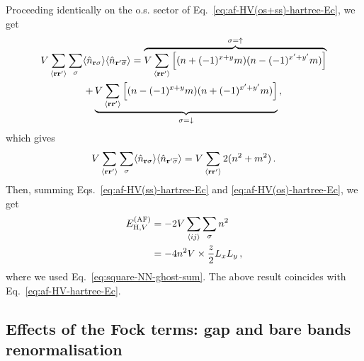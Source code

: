 \begin{tabproof}
	Proceeding identically on the o.s. sector of Eq.~\eqref{eq:af-HV(os+ss)-hartree-Ec}, we get
	\begin{multline*}
		V \sum_{\ev{\mathbf{r}\mathbf{r}'}} \sum_\sigma \langle
		\hat n_{\mathbf{r}\sigma}
		\rangle \langle
		\hat n_{\mathbf{r}'\overline{\sigma}}
		\rangle = \overbrace{
			V \sum_{\ev{\mathbf{r}\mathbf{r}'}} \left[
			(
			n + (-1)^{x+y} m
			) (
			n - (-1)^{x'+y'} m
			)
			\right]
		}^{\sigma=\uparrow} \\
		+ \underbrace{
			V \sum_{\ev{\mathbf{r}\mathbf{r}'}} \left[
			(
			n - (-1)^{x+y} m
			) (
			n + (-1)^{x'+y'} m
			)
			\right]
		}_{\sigma=\downarrow} \, ,
	\end{multline*}
	which gives
	\begin{equation}\label{eq:af-HV(os)-hartree-Ec}
		V \sum_{\ev{\mathbf{r}\mathbf{r}'}} \sum_\sigma \langle
		\hat n_{\mathbf{r}\sigma}
		\rangle \langle
		\hat n_{\mathbf{r}'\overline{\sigma}}
		\rangle = V \sum_{\ev{\mathbf{r}\mathbf{r}'}} 2(
		n^2+m^2
		) \, .
	\end{equation}
	Then, summing Eqs.~\eqref{eq:af-HV(ss)-hartree-Ec} and \eqref{eq:af-HV(os)-hartree-Ec}, we get
	\[
	\begin{aligned}
	E_{\mathrm{H},V}^{(\mathrm{AF})} &= - 2V \sum_{\ev{ij}} \sum_\sigma n^2 \\
	&= - 4n^2 V \times \frac{z}{2} L_x L_y \, ,
	\end{aligned}
	\]
	where we used Eq.~\eqref{eq:square-NN-ghost-sum}. 	The above result coincides with Eq.~\eqref{eq:af-HV-hartree-Ec}.
\end{tabproof}

\subsection{Effects of the Fock terms: gap and bare bands renormalisation}\label{subsec:af-fock}

